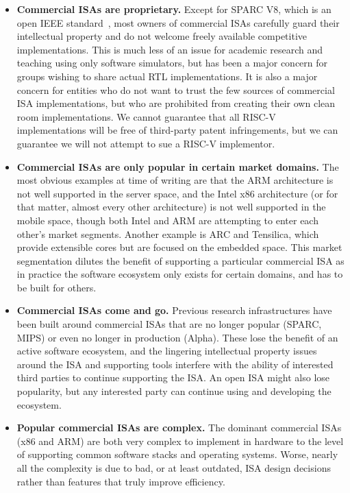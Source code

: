 \begin{itemize}
\item {\bf Commercial ISAs are proprietary.}  Except for SPARC V8,
  which is an open IEEE standard~\cite{sparcieee1994}, most owners of
  commercial ISAs carefully guard their intellectual property and do
  not welcome freely available competitive implementations.  This is
  much less of an issue for academic research and teaching using only
  software simulators, but has been a major concern for groups wishing
  to share actual RTL implementations.  It is also a major concern for
  entities who do not want to trust the few sources of commercial ISA
  implementations, but who are prohibited from creating their own
  clean room implementations.  We cannot guarantee that all RISC-V
  implementations will be free of third-party patent infringements,
  but we can guarantee we will not attempt to sue a RISC-V
  implementor.

\item {\bf Commercial ISAs are only popular in certain market
  domains.}  The most obvious examples at time of writing are that
  the ARM architecture is not well supported in the server space, and
  the Intel x86 architecture (or for that matter, almost every other
  architecture) is not well supported in the mobile space, though both
  Intel and ARM are attempting to enter each other's market segments.
  Another example is ARC and Tensilica, which provide extensible cores
  but are focused on the embedded space.  This market segmentation
  dilutes the benefit of supporting a particular commercial ISA as in
  practice the software ecosystem only exists for certain domains, and
  has to be built for others.

\item {\bf Commercial ISAs come and go.}  Previous research
  infrastructures have been built around commercial ISAs that are no
  longer popular (SPARC, MIPS) or even no longer in production
  (Alpha).  These lose the benefit of an active software ecosystem,
  and the lingering intellectual property issues around the ISA and
  supporting tools interfere with the ability of interested third
  parties to continue supporting the ISA.  An open ISA might also lose
  popularity, but any interested party can continue using and
  developing the ecosystem.

\item {\bf Popular commercial ISAs are complex.}  The dominant
  commercial ISAs (x86 and ARM) are both very complex to implement in
  hardware to the level of supporting common software stacks and
  operating systems.  Worse, nearly all the complexity is due to bad,
  or at least outdated, ISA design decisions rather than features that
  truly improve efficiency.


\end{itemize}
